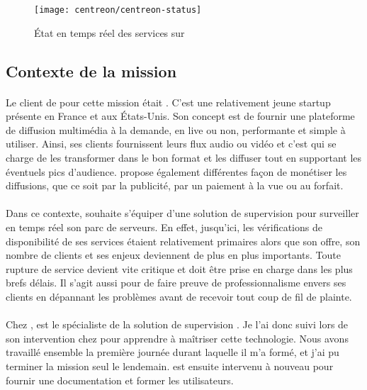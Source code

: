 \begin{figure}
	\centering
	\texttt{[image: centreon/centreon-status]}
	\caption{État en temps réel des services sur \acentreon{}}
	\label{figure:centreon:centreon}
\end{figure}


\subsection{Contexte de la mission}

\paragraph{}
Le client de \asmile{} pour cette mission était \adacast.
C'est une relativement jeune startup présente en France et aux États-Unis.
Son concept est de fournir une plateforme de diffusion multimédia à la demande, en live ou non, performante et simple à utiliser.
Ainsi, ses clients fournissent leurs flux audio ou vidéo et c'est \adacast{} qui se charge de les transformer dans le bon format et les diffuser tout en supportant les éventuels pics d'audience.
\adacast{} propose également différentes façon de monétiser les diffusions, que ce soit par la publicité, par un paiement à la vue ou au forfait.

\paragraph{}
Dans ce contexte, \adacast{} souhaite s'équiper d'une solution de supervision pour surveiller en temps réel son parc de serveurs.
En effet, jusqu'ici, les vérifications de disponibilité de ses services étaient relativement primaires alors que son offre, son nombre de clients et ses enjeux deviennent de plus en plus importants.
Toute rupture de service devient vite critique et doit être prise en charge dans les plus brefs délais.
Il s'agit aussi pour \adacast{} de faire preuve de professionnalisme envers ses clients en dépannant les problèmes avant de recevoir tout coup de fil de plainte.

\paragraph{}
Chez \asmile{}, \asegir{} est le spécialiste de la solution de supervision \acentreon{}.
Je l'ai donc suivi lors de son intervention chez \adacast{} pour apprendre à maîtriser cette technologie.
Nous avons travaillé ensemble la première journée durant laquelle il m'a formé, et j'ai pu terminer la mission seul le lendemain.
\asegir{} est ensuite intervenu à nouveau pour fournir une documentation et former les utilisateurs.


